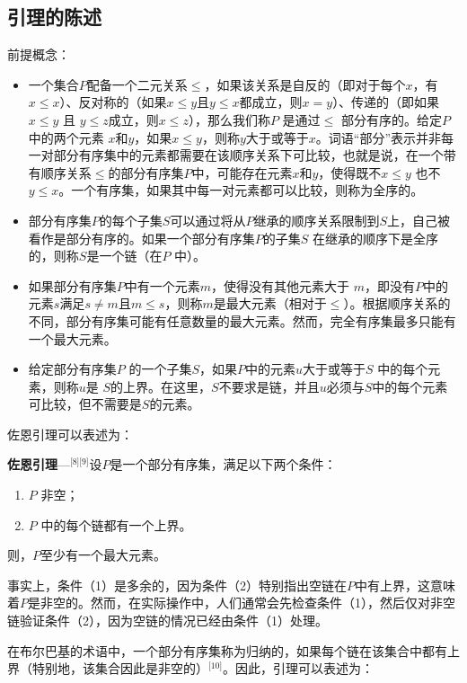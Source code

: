 \subsection{引理的陈述}  
前提概念：
\begin{itemize}
\item 一个集合\( P \)配备一个二元关系\( \leq \)，如果该关系是自反的（即对于每个\( x \)，有\( x \leq x \)）、反对称的（如果\( x \leq y \)且\( y \leq x \)都成立，则\( x = y \)）、传递的（即如果\( x \leq y \) 且 \( y \leq z \)成立，则\( x \leq z \)），那么我们称\( P \) 是通过\( \leq \) 部分有序的。给定\( P \)中的两个元素 \( x \)和\( y \)，如果\( x \leq y \)，则称\( y \)大于或等于\( x \)。词语“部分”表示并非每一对部分有序集中的元素都需要在该顺序关系下可比较，也就是说，在一个带有顺序关系\( \leq \)的部分有序集\( P \)中，可能存在元素\( x \)和\( y \)，使得既不\( x \leq y \) 也不\( y \leq x \)。一个有序集，如果其中每一对元素都可以比较，则称为全序的。
\item 部分有序集\( P \)的每个子集\( S \)可以通过将从\( P \)继承的顺序关系限制到\( S \)上，自己被看作是部分有序的。如果一个部分有序集\( P \)的子集\( S \) 在继承的顺序下是全序的，则称\( S \)是一个链（在\( P \) 中）。
\item 如果部分有序集\( P \)中有一个元素\( m \)，使得没有其他元素大于 \( m \)，即没有\( P \)中的元素\( s \)满足\( s \neq m \)且\( m \leq s \)，则称\( m \)是最大元素（相对于\( \leq \)）。根据顺序关系的不同，部分有序集可能有任意数量的最大元素。然而，完全有序集最多只能有一个最大元素。
\item 给定部分有序集\( P \) 的一个子集\( S \)，如果\( P \)中的元素\( u \)大于或等于\( S \) 中的每个元素，则称\( u \)是 \( S \)的上界。在这里，\( S \)不要求是链，并且\( u \)必须与\( S \)中的每个元素可比较，但不需要是\( S \)的元素。
\end{itemize}
佐恩引理可以表述为：

\textbf{佐恩引理}—\(^\text{[8][9]}\)设\( P \)是一个部分有序集，满足以下两个条件：
\begin{enumerate}
\item \( P \) 非空；
\item \( P \) 中的每个链都有一个上界。
\end{enumerate}
则，\( P \)至少有一个最大元素。

事实上，条件（1）是多余的，因为条件（2）特别指出空链在\( P \)中有上界，这意味着\( P \)是非空的。然而，在实际操作中，人们通常会先检查条件（1），然后仅对非空链验证条件（2），因为空链的情况已经由条件（1）处理。

在布尔巴基的术语中，一个部分有序集称为归纳的，如果每个链在该集合中都有上界（特别地，该集合因此是非空的）\(^\text{[10]}\)。因此，引理可以表述为：

